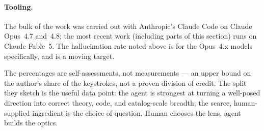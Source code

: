 \paragraph{Tooling.} The bulk of the work was carried out with Anthropic's
Claude Code on Claude Opus~4.7 and~4.8; the most recent work (including parts
of this section) runs on Claude Fable~5. The hallucination rate noted above is
for the Opus~4.x models specifically, and is a moving target.

The percentages are self-assessments, not measurements --- an upper bound on
the author's share of the keystrokes, not a proven division of credit. The
split they sketch is the useful data point: the agent is strongest at turning
a well-posed direction into correct theory, code, and catalog-scale breadth;
the scarce, human-supplied ingredient is the choice of question. Human chooses
the lens, agent builds the optics.

